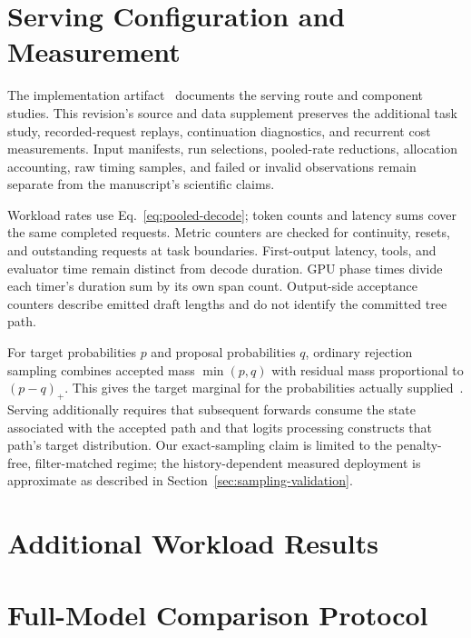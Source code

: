 \documentclass[conference]{IEEEtran}
\begin{document}
\appendices
\section{Serving Configuration and Measurement}
\label{app:audit}
\label{app:settings}
The implementation artifact~\cite{lumo2026archive} documents the serving route and component studies. This revision's source and data supplement preserves the additional task study, recorded-request replays, continuation diagnostics, and recurrent cost measurements. Input manifests, run selections, pooled-rate reductions, allocation accounting, raw timing samples, and failed or invalid observations remain separate from the manuscript's scientific claims.


Workload rates use Eq.~\ref{eq:pooled-decode}; token counts and latency sums cover the same completed requests. Metric counters are checked for continuity, resets, and outstanding requests at task boundaries. First-output latency, tools, and evaluator time remain distinct from decode duration. GPU phase times divide each timer's duration sum by its own span count. Output-side acceptance counters describe emitted draft lengths and do not identify the committed tree path.

For target probabilities $p$ and proposal probabilities $q$, ordinary rejection sampling combines accepted mass $\min(p,q)$ with residual mass proportional to $(p-q)_+$. This gives the target marginal for the probabilities actually supplied~\cite{leviathan2023fast,chen2023sampling}. Serving additionally requires that subsequent forwards consume the state associated with the accepted path and that logits processing constructs that path's target distribution. Our exact-sampling claim is limited to the penalty-free, filter-matched regime; the history-dependent measured deployment is approximate as described in Section~\ref{sec:sampling-validation}.

\section{Additional Workload Results}
\label{app:workload}


\section{Full-Model Comparison Protocol}
\label{app:fullmodel-protocol}


\FloatBarrier
\label{ReferencesStart}


\end{document}

